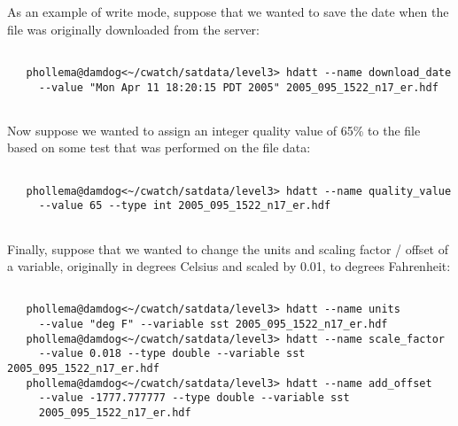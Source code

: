  As an example of write mode, suppose that we wanted to save the date when the file was originally downloaded from the server: \begin{verbatim}

   phollema@damdog<~/cwatch/satdata/level3> hdatt --name download_date 
     --value "Mon Apr 11 18:20:15 PDT 2005" 2005_095_1522_n17_er.hdf
 
\end{verbatim}
 Now suppose we wanted to assign an integer quality value of 65\% to the file based on some test that was performed on the file data: \begin{verbatim}

   phollema@damdog<~/cwatch/satdata/level3> hdatt --name quality_value 
     --value 65 --type int 2005_095_1522_n17_er.hdf 
 
\end{verbatim}
 Finally, suppose that we wanted to change the units and scaling factor / offset of a variable, originally in degrees Celsius and scaled by 0.01, to degrees Fahrenheit: \begin{verbatim}

   phollema@damdog<~/cwatch/satdata/level3> hdatt --name units 
     --value "deg F" --variable sst 2005_095_1522_n17_er.hdf
   phollema@damdog<~/cwatch/satdata/level3> hdatt --name scale_factor 
     --value 0.018 --type double --variable sst 2005_095_1522_n17_er.hdf
   phollema@damdog<~/cwatch/satdata/level3> hdatt --name add_offset 
     --value -1777.777777 --type double --variable sst 
     2005_095_1522_n17_er.hdf
 
\end{verbatim}


\newpage
